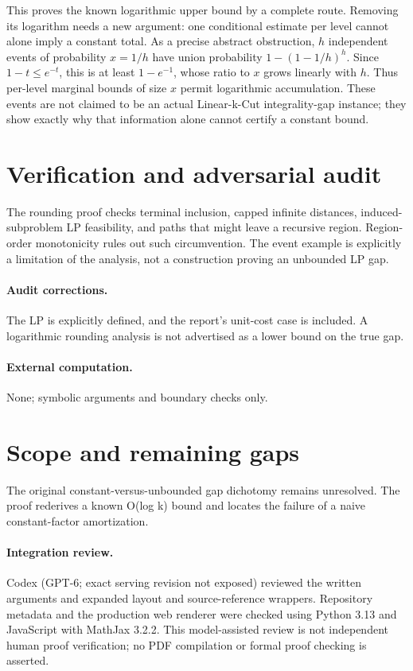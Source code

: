 \documentclass[11pt]{article}
\begin{document}
This proves the known logarithmic upper bound by a complete route. Removing its logarithm needs a new argument: one conditional estimate per level cannot alone imply a constant total. As a precise abstract obstruction, $h$ independent events of probability $x=1/h$ have union probability $1-(1-1/h)^h$. Since $1-t\le e^{-t}$, this is at least $1-e^{-1}$, whose ratio to $x$ grows linearly with $h$. Thus per-level marginal bounds of size $x$ permit logarithmic accumulation. These events are not claimed to be an actual Linear-k-Cut integrality-gap instance; they show exactly why that information alone cannot certify a constant bound.
\section{Verification and adversarial audit}
The rounding proof checks terminal inclusion, capped infinite distances, induced-subproblem LP feasibility, and paths that might leave a recursive region. Region-order monotonicity rules out such circumvention. The event example is explicitly a limitation of the analysis, not a construction proving an unbounded LP gap.
\paragraph{Audit corrections.} The LP is explicitly defined, and the report's unit-cost case is included. A logarithmic rounding analysis is not advertised as a lower bound on the true gap.
\paragraph{External computation.} None; symbolic arguments and boundary checks only.
\section{Scope and remaining gaps}
The original constant-versus-unbounded gap dichotomy remains unresolved. The proof rederives a known O(log k) bound and locates the failure of a naive constant-factor amortization.
\paragraph{Integration review.} Codex (GPT-6; exact serving revision not exposed) reviewed the written arguments and expanded layout and source-reference wrappers. Repository metadata and the production web renderer were checked using Python 3.13 and JavaScript with MathJax 3.2.2. This model-assisted review is not independent human proof verification; no PDF compilation or formal proof checking is asserted.
\end{document}
